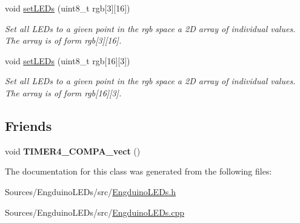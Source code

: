 \begin{DoxyCompactItemize}
void \hyperlink{group___engduino_l_e_ds_ga0a9653a83047056363d0fca5628ed0c9}{set\+L\+E\+Ds} (uint8\+\_\+t rgb\mbox{[}3\mbox{]}\mbox{[}16\mbox{]})
\begin{DoxyCompactList}\small\item\em Set all L\+E\+Ds to a given point in the rgb space a 2\+D array of individual values. The array is of form rgb\mbox{[}3\mbox{]}\mbox{[}16\mbox{]}. \end{DoxyCompactList}\item 
void \hyperlink{group___engduino_l_e_ds_ga41d42e2b694c6a1de7e0e53d9b85c2bb}{set\+L\+E\+Ds} (uint8\+\_\+t rgb\mbox{[}16\mbox{]}\mbox{[}3\mbox{]})
\begin{DoxyCompactList}\small\item\em Set all L\+E\+Ds to a given point in the rgb space a 2\+D array of individual values. The array is of form rgb\mbox{[}16\mbox{]}\mbox{[}3\mbox{]}. \end{DoxyCompactList}\end{DoxyCompactItemize}
\subsection*{Friends}
\begin{DoxyCompactItemize}
\item 
\hypertarget{class_engduino_l_e_ds_class_a53c4be4b5bb54690ef9012fde8d97b9c}{}void {\bfseries T\+I\+M\+E\+R4\+\_\+\+C\+O\+M\+P\+A\+\_\+vect} ()\label{class_engduino_l_e_ds_class_a53c4be4b5bb54690ef9012fde8d97b9c}

\end{DoxyCompactItemize}


The documentation for this class was generated from the following files\+:\begin{DoxyCompactItemize}
\item 
Sources/\+Engduino\+L\+E\+Ds/src/\hyperlink{_engduino_l_e_ds_8h}{Engduino\+L\+E\+Ds.\+h}\item 
Sources/\+Engduino\+L\+E\+Ds/src/\hyperlink{_engduino_l_e_ds_8cpp}{Engduino\+L\+E\+Ds.\+cpp}\end{DoxyCompactItemize}
